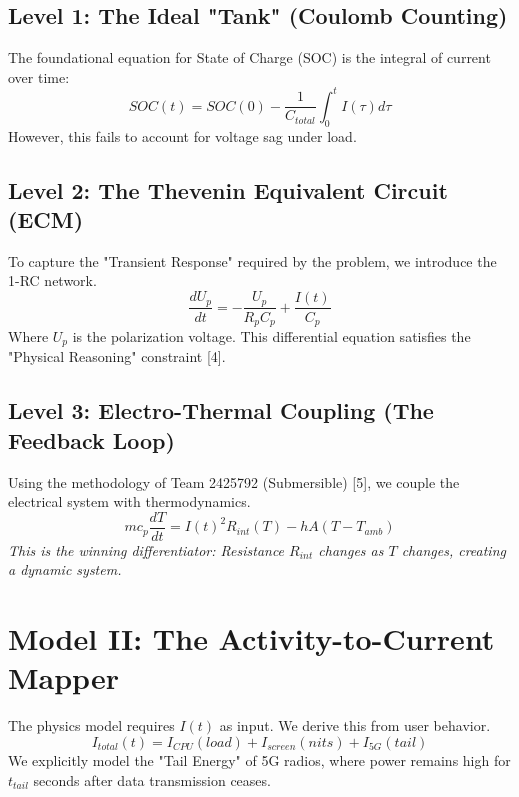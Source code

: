 \documentclass[12pt]{article}
\begin{document}
\subsection{Level 1: The Ideal "Tank" (Coulomb Counting)}
The foundational equation for State of Charge (SOC) is the integral of current over time:
\begin{equation}
    SOC(t) = SOC(0) - \frac{1}{C_{total}} \int_{0}^{t} I(\tau) d\tau
\end{equation}
However, this fails to account for voltage sag under load.

\subsection{Level 2: The Thevenin Equivalent Circuit (ECM)}
To capture the "Transient Response" required by the problem, we introduce the 1-RC network.
\begin{equation}
    \frac{d U_{p}}{dt} = -\frac{U_{p}}{R_p C_p} + \frac{I(t)}{C_p}
\end{equation}
Where $U_{p}$ is the polarization voltage. This differential equation satisfies the "Physical Reasoning" constraint [4].

\subsection{Level 3: Electro-Thermal Coupling (The Feedback Loop)}
Using the methodology of Team 2425792 (Submersible) [5], we couple the electrical system with thermodynamics.
\begin{equation}
    m c_p \frac{dT}{dt} = I(t)^2 R_{int}(T) - hA(T - T_{amb})
\end{equation}
\textit{This is the winning differentiator: Resistance $R_{int}$ changes as $T$ changes, creating a dynamic system.}

\section{Model II: The Activity-to-Current Mapper}
The physics model requires $I(t)$ as input. We derive this from user behavior.
\begin{equation}
    I_{total}(t) = I_{CPU}(load) + I_{screen}(nits) + I_{5G}(tail)
\end{equation}
We explicitly model the "Tail Energy" of 5G radios, where power remains high for $t_{tail}$ seconds after data transmission ceases.
\end{document}
